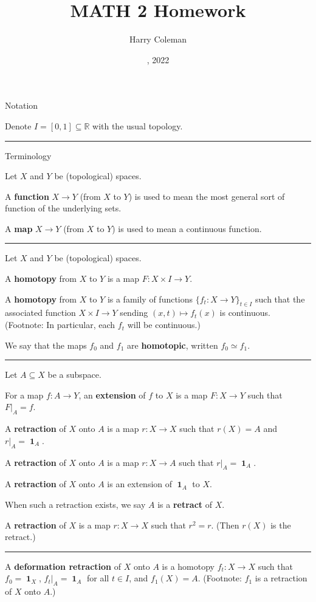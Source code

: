\documentclass[12pt]{article}
\renewcommand{\maketitle}{\thispagestyle{title}}
\newcommand{\keyword}[1]{\textbf{#1}}
\newcommand{\sepline}{\rule{\textwidth}{0.4pt}}
\theoremstyle{definition}
\newcommand{\R}{\mathbb{R}}
\newcommand{\<}{\langle}
\renewcommand{\>}{\rangle}
\DeclareMathOperator{\id}{\mathbf{1}}
\newcommand{\htpy}{\simeq}
\begin{document}
\title{MATH 2 Homework }
\author{Harry Coleman}
\date{, 2022}
\maketitle

Notation

Denote $I = [0, 1] \subseteq \R$ with the usual topology.

\sepline

Terminology

Let $X$ and $Y$ be (topological) spaces.

A \keyword{function} $X \to Y$ (from $X$ to $Y$) is used to mean the most general sort of function of the underlying sets.

A \keyword{map} $X \to Y$ (from $X$ to $Y$) is used to mean a continuous function. 



\sepline

Let $X$ and $Y$ be (topological) spaces.

A \keyword{homotopy} from $X$ to $Y$ is a map $F : X \times I \to Y$.

A \keyword{homotopy} from $X$ to $Y$ is a family of functions $\{f_t : X \to Y\}_{t \in I}$ such that the associated function $X \times I \to Y$ sending $(x, t) \mapsto f_t(x)$ is continuous.
(Footnote: In particular, each $f_t$ will be continuous.)

We say that the maps $f_0$ and $f_1$ are \keyword{homotopic}, written $f_0 \htpy f_1$.

\sepline

Let $A \subseteq X$ be a subspace.

For a map $f : A \to Y$, an \keyword{extension} of $f$ to $X$ is a map $F : X \to Y$ such that $F|_A = f$.

A \keyword{retraction} of $X$ onto $A$ is a map $r : X \to X$ such that $r(X) = A$ and $r|_A = \id_A$.

A \keyword{retraction} of $X$ onto $A$ is a map $r : X \to A$ such that $r|_A = \id_A$.

A \keyword{retraction} of $X$ onto $A$ is an extension of $\id_A$ to $X$.

When such a retraction exists, we say $A$ is a \keyword{retract} of $X$.

A \keyword{retraction} of $X$ is a map $r : X \to X$ such that $r^2 = r$. (Then $r(X)$ is the retract.)

\sepline

A \keyword{deformation retraction} of $X$ onto $A$ is a homotopy $f_t : X \to X$ such that $f_0 = \id_X$, $f_t|_A = \id_A$ for all $t \in I$, and $f_1(X) = A$.
(Footnote: $f_1$ is a retraction of $X$ onto $A$.)
\end{document}
